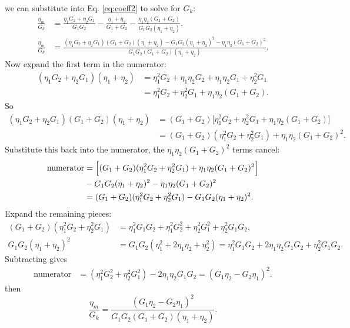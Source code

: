 \documentclass[12pt, a4paper]{article}
\numberwithin{equation}{section}
\begin{document}
we can substitute into Eq. \ref{eq:coeff2} to solve for $G_k$:
\begin{align*}
	\frac{\eta_m}{G_k}
	&=
	\frac{\eta_1 G_2 + \eta_2 G_1}{G_1G_2}
	-\frac{\eta_1+\eta_2}{G_1+G_2}
	-\frac{\eta_1\eta_2(G_1+G_2)}{G_1G_2(\eta_1+\eta_2)}.
	\\
	\frac{\eta_m}{G_k}
	&=
	\frac{
	(\eta_1G_2+\eta_2G_1)(G_1+G_2)(\eta_1+\eta_2)
	- G_1G_2(\eta_1+\eta_2)^2
	- \eta_1\eta_2(G_1+G_2)^2
	}{
	G_1G_2(G_1+G_2)(\eta_1+\eta_2)
	}.
\end{align*}
Now expand the first term in the numerator:
\begin{align*}
	(\eta_1G_2+\eta_2G_1)(\eta_1+\eta_2)
	&=
	\eta_1^2G_2 + \eta_1\eta_2G_2 + \eta_1\eta_2G_1 + \eta_2^2G_1 \\
	&=
	\eta_1^2G_2 + \eta_2^2G_1 + \eta_1\eta_2(G_1+G_2).
\end{align*}
So
\begin{align*}
	(\eta_1G_2+\eta_2G_1)(G_1+G_2)(\eta_1+\eta_2)
	&=
	(G_1+G_2)\bigl[\eta_1^2G_2 + \eta_2^2G_1 + \eta_1\eta_2(G_1+G_2)\bigr] \\
	&=
	(G_1+G_2)(\eta_1^2G_2 + \eta_2^2G_1) + \eta_1\eta_2(G_1+G_2)^2.
\end{align*}
Substitute this back into the numerator, the $\eta_1\eta_2(G_1+G_2)^2$ terms cancel:
\begin{align*}
	\text{numerator}
	&=
	\Bigl[(G_1+G_2)(\eta_1^2G_2 + \eta_2^2G_1) + \eta_1\eta_2(G_1+G_2)^2\Bigr]\\
	&- G_1G_2(\eta_1+\eta_2)^2
	- \eta_1\eta_2(G_1+G_2)^2 \\
	&=
	(G_1+G_2)(\eta_1^2G_2 + \eta_2^2G_1) - G_1G_2(\eta_1+\eta_2)^2.
\end{align*}
Expand the remaining pieces:
\begin{align*}
	(G_1+G_2)(\eta_1^2G_2 + \eta_2^2G_1)
	&=
	\eta_1^2G_1G_2 + \eta_1^2G_2^2 + \eta_2^2G_1^2 + \eta_2^2G_1G_2, \\
	G_1G_2(\eta_1+\eta_2)^2
	&=
	G_1G_2(\eta_1^2 + 2\eta_1\eta_2 + \eta_2^2)
	=
	\eta_1^2G_1G_2 + 2\eta_1\eta_2G_1G_2 + \eta_2^2G_1G_2.
\end{align*}
Subtracting gives
\begin{align*}
	\text{numerator}
	&=
	(\eta_1^2G_2^2 + \eta_2^2G_1^2) - 2\eta_1\eta_2G_1G_2
	=
	(G_1\eta_2 - G_2\eta_1)^2.
\end{align*}
then
\begin{equation*}
	\frac{\eta_m}{G_k}
	=
	\frac{(G_1\eta_2 - G_2\eta_1)^2}{G_1G_2(G_1+G_2)(\eta_1+\eta_2)}.
\end{equation*}
\end{document}
